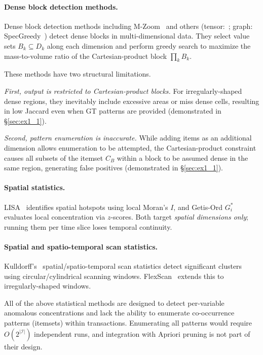 \paragraph{Dense block detection methods.}
Dense block detection methods
including M-Zoom~\cite{shin2018mzoom}
and others (tensor:~\cite{jiang2015crossspot,shin2018mbiz,shin2017dcube,shin2017densealert,shin2023catchcore};
graph: SpecGreedy~\cite{feng2020specgreedy})
detect dense blocks in multi-dimensional data.
They select value sets $B_k \subseteq D_k$ along each dimension
and perform greedy search to maximize
the mass-to-volume ratio of the Cartesian-product block
$\prod_k B_k$.

These methods have two structural limitations.

\emph{First, output is restricted to Cartesian-product blocks.}
For irregularly-shaped dense regions,
they inevitably include excessive areas
or miss dense cells,
resulting in low Jaccard even when GT patterns are provided
(demonstrated in \S\ref{sec:ex1_1}).

\emph{Second, pattern enumeration is inaccurate.}
While adding items as an additional dimension
allows enumeration to be attempted,
the Cartesian-product constraint causes all subsets
of the itemset $C_B$ within a block
to be assumed dense in the same region,
generating false positives (demonstrated in \S\ref{sec:ex1_1}).

\paragraph{Spatial statistics.}
LISA~\cite{anselin1995lisa} identifies spatial hotspots
using local Moran's $I$, and
Getis-Ord $G_i^*$~\cite{ord1995getis} evaluates
local concentration via $z$-scores.
Both target \emph{spatial dimensions only};
running them per time slice
loses temporal continuity.

\paragraph{Spatial and spatio-temporal scan statistics.}
Kulldorff's~\cite{kulldorff1997spatial,kulldorff2001prospective}
spatial/spatio-temporal scan statistics detect
significant clusters using circular/cylindrical scanning windows.
FlexScan~\cite{tango2005flexscan} extends this
to irregularly-shaped windows.

All of the above statistical methods are designed
to detect per-variable anomalous concentrations
and lack the ability to enumerate co-occurrence patterns (itemsets)
within transactions.
Enumerating all patterns would require
$O(2^{|\mathcal{I}|})$ independent runs,
and integration with Apriori pruning is not part of their design.

